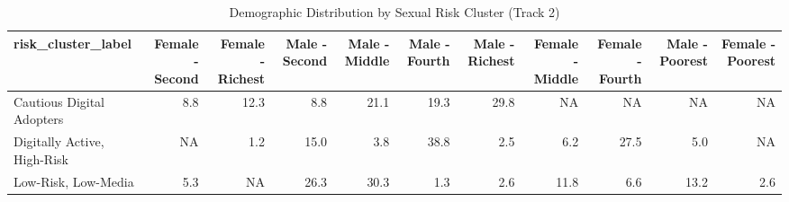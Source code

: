 \documentclass[border=1mm]{standalone}
\begin{document}
\begin{table}
\centering
\caption{\label{tab:risk sex & wealth}Demographic Distribution by Sexual Risk Cluster (Track 2)}
\centering
\begin{tabular}[t]{l|r|r|r|r|r|r|r|r|r|r}
\hline
risk\_cluster\_label & Female - Second & Female - Richest & Male - Second & Male - Middle & Male - Fourth & Male - Richest & Female - Middle & Female - Fourth & Male - Poorest & Female - Poorest\\
\hline
Cautious Digital Adopters & 8.8 & 12.3 & 8.8 & 21.1 & 19.3 & 29.8 & NA & NA & NA & NA\\
\hline
Digitally Active, High-Risk & NA & 1.2 & 15.0 & 3.8 & 38.8 & 2.5 & 6.2 & 27.5 & 5.0 & NA\\
\hline
Low-Risk, Low-Media & 5.3 & NA & 26.3 & 30.3 & 1.3 & 2.6 & 11.8 & 6.6 & 13.2 & 2.6\\
\hline
\end{tabular}
\end{table}
\end{document}
